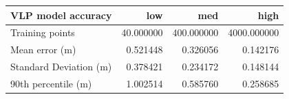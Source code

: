 \begin{tabular}{lrrr}
\toprule
VLP model accuracy & low & med & high \\
\midrule
Training points & 40.000000 & 400.000000 & 4000.000000 \\
Mean error (m) & 0.521448 & 0.326056 & 0.142176 \\
Standard Deviation (m) & 0.378421 & 0.234172 & 0.148144 \\
90th percentile (m) & 1.002514 & 0.585760 & 0.258685 \\
\bottomrule
\end{tabular}

